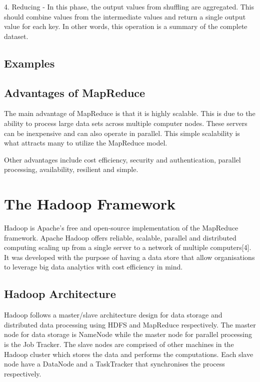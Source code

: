 \documentclass[11pt]{book}
\begin{document}
4. Reducing - In this phase, the output values from shuffling are aggregated. This should combine values from the intermediate values and return a single output value for each key. In other words, this operation is a summary of the complete dataset.

\section{Examples}



\section{Advantages of MapReduce}

The main advantage of MapReduce is that it is highly scalable. This is due to the ability to process large data sets across multiple computer nodes. These servers can be inexpensive and can also operate in parallel. This simple scalability is what attracts many to utilize the MapReduce model.

Other advantages include cost efficiency, security and authentication, parallel processing, availability, resilient and simple.


\chapter{The Hadoop Framework}

Hadoop is Apache's free and open-source implementation of the MapReduce framework. Apache Hadoop offers reliable, scalable, parallel and distributed computing scaling up from a single server to a network of multiple computers[4]. It was developed with the purpose of having a data store that allow organisations to leverage big data analytics with cost efficiency in mind.\\


\section{Hadoop Architecture}

Hadoop follows a master/slave architecture design for data storage and distributed data processing using HDFS and MapReduce respectively. The master node for data storage is NameNode while the master node for parallel processing is the Job Tracker. The slave nodes are comprised of other machines in the Hadoop cluster which stores the data and performs the computations. Each slave node have a DataNode and a TaskTracker that synchronises the process respectively. \\
\end{document}
